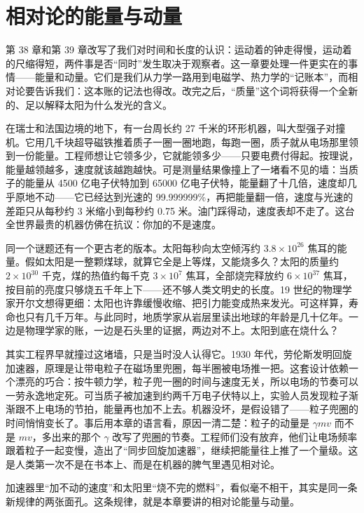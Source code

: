 \chapter{相对论的能量与动量}

第 38 章和第 39 章改写了我们对时间和长度的认识：运动着的钟走得慢，运动着的尺缩得短，两件事是否“同时”发生取决于观察者。这一章要处理一件更实在的事情——能量和动量。它们是我们从力学一路用到电磁学、热力学的“记账本”，而相对论要告诉我们：这本账的记法也得改。改完之后，“质量”这个词将获得一个全新的、足以解释太阳为什么发光的含义。


\begin{mainline}
在瑞士和法国边境的地下，有一台周长约 27 千米的环形机器，叫大型强子对撞机。它用几千块超导磁铁推着质子一圈一圈地跑，每跑一圈，质子就从电场那里领到一份能量。工程师想让它领多少，它就能领多少——只要电费付得起。按理说，能量越领越多，速度就该越跑越快。可是测量结果像撞上了一堵看不见的墙：当质子的能量从 4500 亿电子伏特加到 65000 亿电子伏特，能量翻了十几倍，速度却几乎原地不动——它已经达到光速的 99.999999\%，再把能量翻一倍，速度与光速的差距只从每秒约 3 米缩小到每秒约 0.75 米。油门踩得动，速度表却不走了。这台全世界最贵的机器仿佛在抗议：你加的不是速度。

同一个谜题还有一个更古老的版本。太阳每秒向太空倾泻约 \(3.8\times10^{26}\) 焦耳的能量。假如太阳是一整颗煤球，就算它全是上等煤，又能烧多久？太阳的质量约 \(2\times10^{30}\) 千克，煤的热值约每千克 \(3\times10^{7}\) 焦耳，全部烧完释放约 \(6\times10^{37}\) 焦耳，按目前的亮度只够烧五千年上下——还不够人类文明史的长度。19 世纪的物理学家开尔文想得更细：太阳也许靠缓慢收缩、把引力能变成热来发光。可这样算，寿命也只有几千万年。与此同时，地质学家从岩层里读出地球的年龄是几十亿年。一边是物理学家的账，一边是石头里的证据，两边对不上。太阳到底在烧什么？

其实工程界早就撞过这堵墙，只是当时没人认得它。1930 年代，劳伦斯发明回旋加速器，原理是让带电粒子在磁场里兜圈，每半圈被电场推一把。这套设计依赖一个漂亮的巧合：按牛顿力学，粒子兜一圈的时间与速度无关，所以电场的节奏可以一劳永逸地定死。可当质子被加速到约两千万电子伏特以上，实验人员发现粒子渐渐跟不上电场的节拍，能量再也加不上去。机器没坏，是假设错了——粒子兜圈的时间悄悄变长了。事后用本章的语言看，原因一清二楚：粒子的动量是 \(\gamma mv\) 而不是 \(mv\)，多出来的那个 \(\gamma\) 改写了兜圈的节奏。工程师们没有放弃，他们让电场频率跟着粒子一起变慢，造出了“同步回旋加速器”，继续把能量往上推了一个量级。这是人类第一次不是在书本上、而是在机器的脾气里遇见相对论。

加速器里“加不动的速度”和太阳里“烧不完的燃料”，看似毫不相干，其实是同一条新规律的两张面孔。这条规律，就是本章要讲的相对论能量与动量。
\end{mainline}

